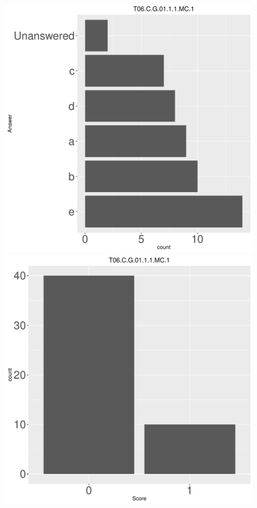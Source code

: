 \documentclass[12pt,english,nohyper]{tufte-handout}\usepackage[]{graphicx}\usepackage[]{color}
\begin{document}
\begin{center} \includegraphics[width=.45\linewidth]{Topic06_AB_19_answer} \includegraphics[width=.45\linewidth]{Topic06_AB_19_score} \end{center} 
\end{document}

